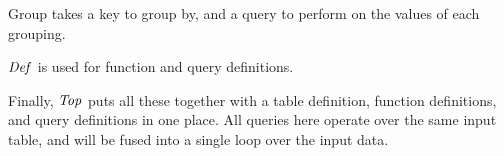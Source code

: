 
Group takes a key to group by, and a query to perform on the values of each grouping.


$\mathit{Def}$ is used for function and query definitions.




Finally, $\mathit{Top}$ puts all these together with a table definition, function definitions, and query definitions in one place.
All queries here operate over the same input table, and will be fused into a single loop over the input data.



